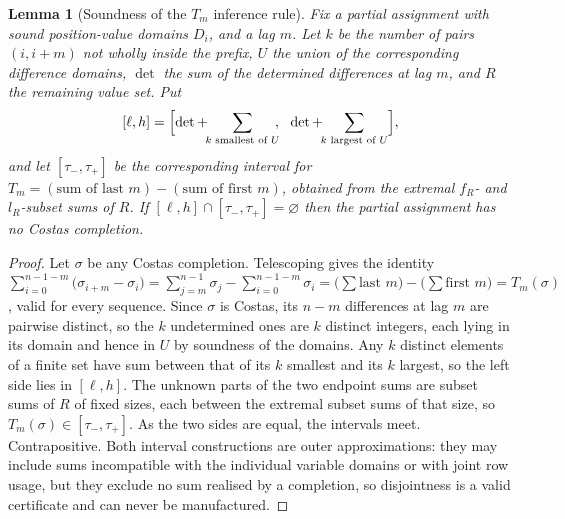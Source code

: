 \documentclass[11pt,a4paper]{article}
\newtheorem{lemma}[theorem]{Lemma}
\theoremstyle{definition}
\begin{document}
\begin{lemma}[Soundness of the $T_m$ inference rule]
\label{lem:tmsound}
Fix a partial assignment with sound position-value domains $D_i$, and a lag $m$.
Let $k$ be the number of pairs $(i,i+m)$ not wholly inside the prefix, $U$ the
union of the corresponding difference domains, $\det$ the sum of the determined
differences at lag $m$, and $R$ the remaining value set. Put
\[
[\ell,h]=\Bigl[\det+\!\!\sum_{k \text{ smallest of } U}\!\!,\ \
\det+\!\!\sum_{k \text{ largest of } U}\Bigr],
\]
and let $[\tau_-,\tau_+]$ be the corresponding interval for
$T_m=(\text{sum of last }m)-(\text{sum of first }m)$, obtained from the extremal
$f_R$- and $l_R$-subset sums of $R$. If $[\ell,h]\cap[\tau_-,\tau_+]=\varnothing$
then the partial assignment has no Costas completion.
\end{lemma}
\begin{proof}
Let $\sigma$ be any Costas completion. Telescoping gives the identity
$\sum_{i=0}^{n-1-m}\bigl(\sigma_{i+m}-\sigma_i\bigr)
=\sum_{j=m}^{n-1}\sigma_j-\sum_{i=0}^{n-1-m}\sigma_i
=\bigl(\textstyle\sum\text{last }m\bigr)-\bigl(\sum\text{first }m\bigr)=T_m(\sigma)$,
valid for every sequence. Since $\sigma$ is Costas, its $n-m$ differences at lag
$m$ are pairwise distinct, so the $k$ undetermined ones are $k$ distinct integers,
each lying in its domain and hence in $U$ by soundness of the domains. Any $k$
distinct elements of a finite set have sum between that of its $k$ smallest and
its $k$ largest, so the left side lies in $[\ell,h]$. The unknown parts of the two
endpoint sums are subset sums of $R$ of fixed sizes, each between the extremal
subset sums of that size, so $T_m(\sigma)\in[\tau_-,\tau_+]$. As the two sides are
equal, the intervals meet. Contrapositive. Both interval constructions are
outer approximations: they may include sums incompatible with the individual
variable domains or with joint row usage, but they exclude no sum realised by a
completion, so disjointness is a valid certificate and can never be manufactured.
\end{proof}
\end{document}
